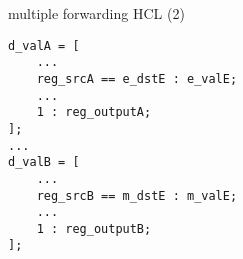\begin{frame}[fragile,label=multForwardHCL2]{multiple forwarding HCL (2)}
\begin{lstlisting}
d_valA = [
    ...
    reg_srcA == e_dstE : e_valE;  
    ...
    1 : reg_outputA;
];
...
d_valB = [
    ...
    reg_srcB == m_dstE : m_valE;
    ...
    1 : reg_outputB;
];
\end{lstlisting}
\end{frame}
